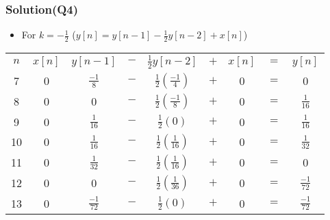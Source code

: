 \documentclass{beamer}
\begin{document}
\begin{frame}
\frametitle{Solution(Q4)}

\begin{itemize} \itemsep1pt \parskip0pt 
  \item[] For $k = -\frac{1}{2}$ ($y[n]=y[n-1]-\frac{1}{2}y[n-2]+x[n]$)
\end{itemize}

\begin{table}
\def\arraystretch{1.5}
\begin{tabular}{ccccccccc}
\hline
$n$ & $x[n]$ & $y[n-1]$ & $-$ & $\frac{1}{2}y[n-2]$ & $+$ & $x[n]$ & $=$ & $y[n]$ \\

7 & 0 & $\frac{-1}{8}$ & $-$ & $\frac{1}{2}(\frac{-1}{4})$ & $+$ & 0 & $=$ & 0 \\ 

8 & 0 & 0 & $-$ & $\frac{1}{2}(\frac{-1}{8})$ & $+$ & 0 & $=$ & $\frac{1}{16}$ \\ 

9 & 0 & $\frac{1}{16}$ & $-$ & $\frac{1}{2}(0)$ & $+$ & 0 & $=$ & $\frac{1}{16}$ \\ 

10 & 0 & $\frac{1}{16}$ & $-$ & $\frac{1}{2}(\frac{1}{16})$ & $+$ & 0 & $=$ & $\frac{1}{32}$ \\ 

11 & 0 & $\frac{1}{32}$ & $-$ & $\frac{1}{2}(\frac{1}{16})$ & $+$ & 0 & $=$ & 0 \\ 
12 & 0 & 0 & $-$ & $\frac{1}{2}(\frac{1}{36})$ & $+$ & 0 & $=$ & $\frac{-1}{72}$ \\ 

13 & 0 & $\frac{-1}{72}$ & $-$ & $\frac{1}{2}(0)$ & $+$ & 0 & $=$ & $\frac{-1}{72}$ \\ 
\hline
\end{tabular}
\end{table}


\end{frame}

\end{document}
